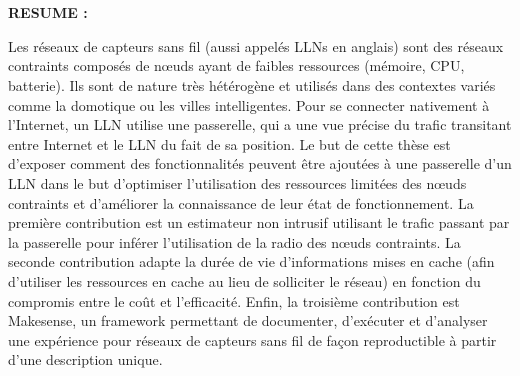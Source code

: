 


\pagestyle{empty}

\AddToShipoutPicture*{\BackgroundPicLastPage}

\vspace{1.5cm}


\begin{center}{\LARGE \textbf{\myTitle}}\\
\vspace{.4cm}
{\large \textbf{\myName}}\\
\end{center}

\vspace{.9cm}

\textbf{RESUME :}

Les réseaux de capteurs sans fil (aussi appelés \ac{LLN}s en anglais) sont des réseaux contraints composés de nœuds ayant de faibles ressources (mémoire, CPU, batterie).
Ils sont de nature très hétérogène et utilisés dans des contextes variés comme la domotique ou les villes intelligentes.
Pour se connecter nativement à l'Internet, un \ac{LLN} utilise une passerelle, qui a une vue précise du trafic transitant entre Internet et le \ac{LLN} du fait de sa position.
Le but de cette thèse est d'exposer comment des fonctionnalités peuvent être ajoutées à une passerelle d'un \ac{LLN} dans le but d'optimiser l'utilisation des ressources limitées des nœuds contraints et d'améliorer la connaissance de leur état de fonctionnement.
La première contribution est un estimateur non intrusif utilisant le trafic passant par la passerelle pour inférer l'utilisation de la radio des nœuds contraints.
La seconde contribution adapte la durée de vie d’informations mises en cache (afin d’utiliser les ressources en cache au lieu de solliciter le réseau) en fonction du compromis entre le coût et l'efficacité.
Enfin, la troisième contribution est Makesense, un framework permettant de documenter, d’exécuter et d’analyser une expérience pour réseaux de capteurs sans fil de façon reproductible à partir d'une description unique.


\vspace{.6cm}

